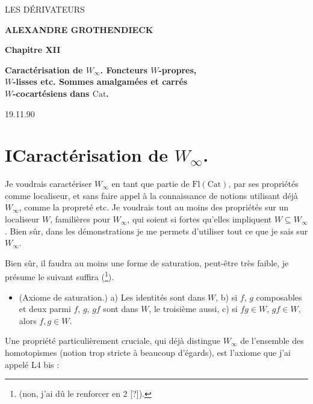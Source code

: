 \documentclass[11pt]{article}
\newcommand{\printedpage}[1]{\marginpar{\footnotesize p.~#1}}
\newcommand{\msp}[1]{\marginpar{\footnotesize [#1]}}
\newcommand{\Cat}{\mathrm{Cat}}
\begin{document}
\printedpage{--}

\begin{center}
{\Large \textsf{LES DÉRIVATEURS}}

\bigskip

\textbf{ALEXANDRE GROTHENDIECK}

\bigskip\bigskip

\textbf{Chapitre XII}

\medskip

\textbf{Caractérisation de $W_\infty$. Foncteurs $W$-propres,\\
$W$-lisses etc. Sommes amalgamées et carrés\\
$W$-cocartésiens dans $\Cat$.}
\end{center}

\clearpage


\printedpage{1}

\msp{page 1}

\hfill 19.11.90

\section*{I\quad Caractérisation de $W_\infty$.}

Je voudrais caractériser $W_\infty$ en tant que partie de $\mathrm{Fl}(\Cat)$, par ses propriétés comme localiseur, et sans faire appel à la connaissance de notions utilisant déjà $W_\infty$, comme la propreté etc. Je voudrais tout au moins des propriétés sur un localiseur $W$, familières pour $W_\infty$, qui soient si fortes qu'elles impliquent $W \subseteq W_\infty$. Bien sûr, dans les démonstrations je me permets d'utiliser tout ce que je sais sur $W_\infty$.

Bien sûr, il faudra au moins une forme de saturation, peut-être très faible, je présume le suivant suffira (\footnote{(non, j'ai dû le renforcer en 2 [?]).}).

\begin{itemize}[leftmargin=*]
\item[\textbf{W(1)}] (Axiome de saturation.) a) Les identités sont dans $W$, b) si $f$, $g$ composables et deux parmi $f$, $g$, $gf$ sont dans $W$, le troisième aussi, c) si $fg \in W$, $gf \in W$, alors $f, g \in W$.
\end{itemize}

Une propriété particulièrement cruciale, qui déjà distingue $W_\infty$ de l'ensemble des homotopismes (notion trop stricte à beaucoup d'égards), est l'axiome que j'ai appelé L4 bis :
\end{document}
